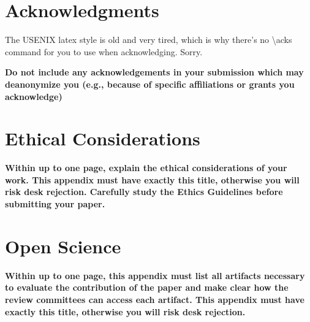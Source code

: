 \documentclass[letterpaper,twocolumn,10pt]{article}
\begin{document}
\section*{Acknowledgments}
The USENIX latex style is old and very tired, which is why
there's no \textbackslash{}acks command for you to use when
acknowledging. Sorry.

\textbf{Do not include any acknowledgements in your submission which may deanonymize you (e.g., because of specific affiliations or grants you acknowledge)}
\cleardoublepage
\appendix
\section*{Ethical Considerations}
\textbf{Within up to one page, explain the ethical considerations of your work. This appendix must have exactly this title, otherwise you will risk desk rejection. Carefully study the Ethics Guidelines before submitting your paper.}
\cleardoublepage

\section*{Open Science}
\textbf{Within up to one page, this appendix must list all artifacts necessary to evaluate the contribution of the paper and make clear how the review committees can access each artifact. This appendix must have exactly this title, otherwise you will risk desk rejection. }
\cleardoublepage


\end{document}
